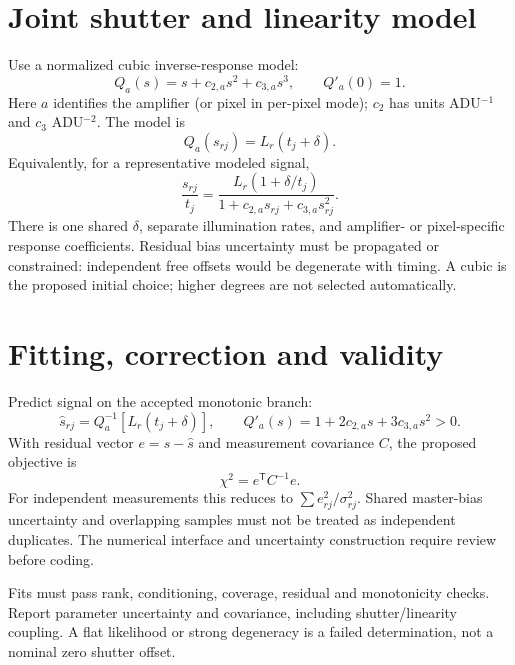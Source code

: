 \documentclass[11pt,a4paper]{article}
\newcommand{\nextpage}{\clearpage}
\begin{document}
\section{Joint shutter and linearity model}
Use a normalized cubic inverse-response model:
\begin{equation}\boxed{Q_a(s)=s+c_{2,a}s^2+c_{3,a}s^3},\qquad Q'_a(0)=1.\end{equation}
Here $a$ identifies the amplifier (or pixel in per-pixel mode); $c_2$ has units ADU$^{-1}$ and $c_3$ ADU$^{-2}$. The model is
\begin{equation}\boxed{Q_a(s_{rj})=L_r(t_j+\delta)}.\end{equation}
Equivalently, for a representative modeled signal,
\begin{equation}\frac{s_{rj}}{t_j}=
\frac{L_r(1+\delta/t_j)}{1+c_{2,a}s_{rj}+c_{3,a}s_{rj}^2}.\end{equation}
There is one shared $\delta$, separate illumination rates, and amplifier- or pixel-specific response coefficients. Residual bias uncertainty must be propagated or constrained: independent free offsets would be degenerate with timing. A cubic is the proposed initial choice; higher degrees are not selected automatically.

\nextpage
\section{Fitting, correction and validity}
Predict signal on the accepted monotonic branch:
\begin{equation}\widehat{s}_{rj}=Q_a^{-1}\!\left[L_r(t_j+\delta)\right],\qquad
Q'_a(s)=1+2c_{2,a}s+3c_{3,a}s^2>0.
\end{equation}
With residual vector $e=s-\widehat{s}$ and measurement covariance $C$, the proposed objective is
\begin{equation}\chi^2=e^{\mathsf T}C^{-1}e.
\end{equation}
For independent measurements this reduces to $\sum e_{rj}^2/\sigma_{rj}^2$. Shared master-bias uncertainty and overlapping samples must not be treated as independent duplicates. The numerical interface and uncertainty construction require review before coding.

Fits must pass rank, conditioning, coverage, residual and monotonicity checks. Report parameter uncertainty and covariance, including shutter/linearity coupling. A flat likelihood or strong degeneracy is a failed determination, not a nominal zero shutter offset.
\end{document}
